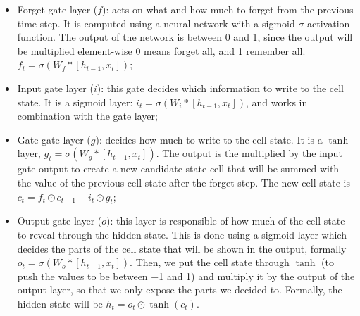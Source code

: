 \begin{itemize}
    \item Forget gate layer ($f$): acts on what and how much to forget from the previous time step. It is computed using a neural network with a sigmoid $\sigma$ activation function. The output of the network is between 0 and 1, since the output will be multiplied element-wise 0 means forget all, and 1 remember all. $f_t = \sigma(W_f * [h_{t-1}, x_t])$;
    \item Input gate layer ($i$): this gate decides which information to write to the cell state. It is a sigmoid layer: $i_t = \sigma(W_i * [h_{t-1}, x_t])$, and works in combination with the gate layer; 
    \item Gate gate layer ($g$): decides how much to write to the cell state. It is a $\tanh$ layer, $g_t = \sigma(W_g * [h_{t-1}, x_t])$. The output is the multiplied by the input gate output to create a new candidate state cell that will be summed with the value of the previous cell state after the forget step. The new cell state is  $c_t = f_t \odot c_{t-1} + i_t \odot g_t$;
    \item Output gate layer ($o$): this layer is responsible of how much of the cell state to reveal through the hidden state. This is done using a sigmoid layer which decides the parts of the cell state that will be shown in the output, formally $o_t = \sigma(W_o * [h_{t-1}, x_t])$. Then, we put the cell state through $\tanh$ (to push the values to be between −1 and 1) and multiply it by the output of the output layer, so that we only expose the parts we decided to. Formally, the hidden state will be $h_t = o_t \odot \tanh(c_t)$.
\end{itemize}



